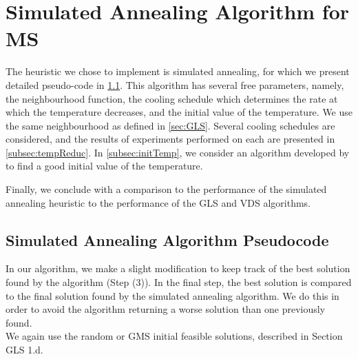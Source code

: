 \documentclass[12pt,a4paper,reqno]{article}
\begin{document}
\newpage
\section{Simulated Annealing Algorithm for MS}
\label{sec:simulatedannealing}

The heuristic we chose to implement is simulated annealing, for which we present detailed pseudo-code in \ref{subsec:SA_pseudo}. This algorithm has several free parameters, namely, the neighbourhood function, the cooling schedule which determines the rate at which the temperature decreases, and the initial value of the temperature. We use the same neighbourhood as defined in \ref{sec:GLS}. Several cooling schedules are considered, and the results of experiments performed on each are presented in \ref{subsec:tempReduc}. In \ref{subsec:initTemp}, we consider an algorithm developed by \citet{ameur2004} to find a good initial value of the temperature.

Finally, we conclude with a comparison to the performance of the simulated annealing heuristic to the performance of the GLS and VDS algorithms.

\subsection{Simulated Annealing Algorithm Pseudocode}
\label{subsec:SA_pseudo}
In our algorithm, we make a slight modification to keep track of the best solution found by the algorithm (Step (3)). In the final step, the best solution is compared to the final solution found by the simulated annealing algorithm. We do this in order to avoid the algorithm returning a worse solution than one previously found. \\

We again use the random or GMS initial feasible solutions, described in Section GLS 1.d. \\
\end{document}
